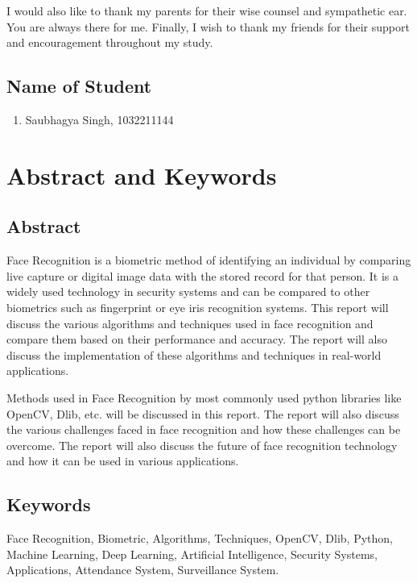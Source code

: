 \documentclass[openany]{report}
\begin{document}
I would also like to thank my parents for their wise counsel and sympathetic ear. You are always there for me. Finally, I wish to thank my friends for their support and encouragement throughout my study.



\section*{Name of Student}
\begin{enumerate}
    \item Saubhagya Singh, 1032211144
\end{enumerate}

\thispagestyle{empty}
\clearpage


\tableofcontents
\thispagestyle{empty}
\clearpage

\chapter*{Abstract and Keywords}

\section{Abstract}
Face Recognition is a biometric method of identifying an individual by comparing live capture or digital image data with the stored record for that person. It is a widely used technology in security systems and can be compared to other biometrics such as fingerprint or eye iris recognition systems. This report will discuss the various algorithms and techniques used in face recognition and compare them based on their performance and accuracy. The report will also discuss the implementation of these algorithms and techniques in real-world applications.

Methods used in Face Recognition by most commonly used python libraries like OpenCV, Dlib, etc. will be discussed in this report. The report will also discuss the various challenges faced in face recognition and how these challenges can be overcome. The report will also discuss the future of face recognition technology and how it can be used in various applications.
\section{Keywords}
Face Recognition, Biometric, Algorithms, Techniques, OpenCV, Dlib, Python, Machine Learning, Deep Learning, Artificial Intelligence, Security Systems, Applications, Attendance System, Surveillance System.
\end{document}
